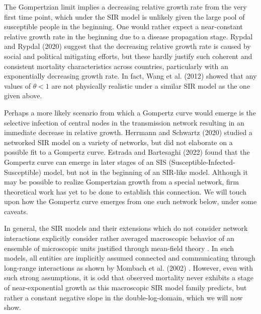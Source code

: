 \documentclass{article}
\begin{document}
 The Gompertzian limit implies a decreasing relative growth rate from the very first time point, which under the SIR model is unlikely given the large pool of susceptible people in the beginning. 
 One would rather expect a near-constant relative growth rate in the beginning due to a disease propagation stage. 
 Rypdal and Rypdal (2020) \cite{Rypdal2020} suggest that the decreasing relative growth rate is caused by social and political mitigating efforts, but these hardly justify such coherent and consistent mortality characteristics across countries, particularly with an exponentially decreasing growth rate. In fact, Wang et al. (2012) \cite{wang2012richards} showed that any values of $\theta<1$ are not physically realistic under a similar SIR model as the one given above. 
 
 Perhaps a more likely scenario from which a Gompertz curve would emerge is the selective infection of central nodes in the transmission network resulting in an immediate decrease in relative growth. 
 Herrmann and Schwartz (2020) \cite{herrmann2020covid} studied a networked SIR model on a variety of networks, but did not elaborate on a possible fit to a Gompertz curve. Estrada and Bartesaghi (2022) \cite{estrada2022networked} found that the Gompertz curve can emerge in later stages of an SIS (Susceptible-Infected-Susceptible) model, but not in the beginning of an SIR-like model.
 Although it may be possible to realize Gompertzian growth from a special network, firm theoretical work has yet to be done to establish this connection. 
 We will touch upon how the Gompertz curve emerges from one such network below, under some caveats.

 In general, the SIR models and their extensions which do not consider network interactions explicitly consider rather averaged macroscopic behavior of an ensemble of microscopic units justified through mean-field theory \cite{smilkov2014beyond}. In such models, all entities are implicitly assumed connected and communicating through long-range interactions as shown by Mombach et al. (2002) \cite{mombach2002mean}.
However, even with such strong assumptions, it is odd that observed mortality never exhibits a stage of near-exponential growth as this macroscopic SIR model family predicts, but rather a constant negative slope in the double-log-domain, which we will now show. 
\end{document}
